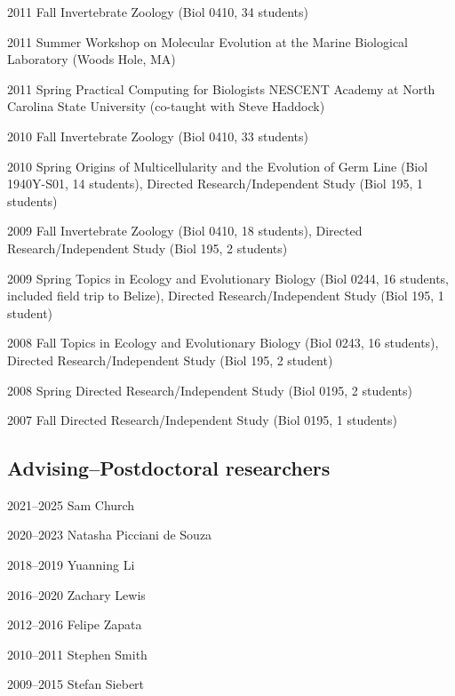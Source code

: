 \begin{entry}{60pt}
\item [\rm 2011 Fall] Invertebrate Zoology (Biol 0410, 34 students)
\item [\rm 2011 Summer] Workshop on Molecular Evolution at the Marine Biological Laboratory (Woods Hole, MA)
\item [\rm 2011 Spring] Practical Computing for Biologists NESCENT Academy at North Carolina State University (co-taught with Steve Haddock)
\item [\rm 2010 Fall] Invertebrate Zoology (Biol 0410, 33 students)
\item [\rm 2010 Spring] Origins of Multicellularity and the Evolution of Germ Line (Biol 1940Y-S01, 14 students), Directed Research/Independent Study (Biol 195, 1 students)
\item [\rm 2009 Fall] Invertebrate Zoology (Biol 0410, 18 students), Directed Research/Independent Study (Biol 195, 2 students)
\item [\rm 2009 Spring] Topics in Ecology and Evolutionary Biology (Biol 0244, 16 students, included field trip to Belize), Directed Research/Independent Study (Biol 195, 1 student)
\item [\rm 2008 Fall] Topics in Ecology and Evolutionary Biology (Biol 0243, 16 students), Directed Research/Independent Study (Biol 195, 2 student)
\item [\rm 2008 Spring] Directed Research/Independent Study (Biol 0195, 2 students)
\item [\rm 2007 Fall] Directed Research/Independent Study (Biol 0195, 1 students)

\end{entry}


\subsection*{Advising--Postdoctoral researchers}

\begin{entry}{60pt}
\item [\rm 2021--2025] Sam Church
\item [\rm 2020--2023] Natasha Picciani de Souza
\item [\rm 2018--2019] Yuanning Li
\item [\rm 2016--2020] Zachary Lewis
\item [\rm 2012--2016] Felipe Zapata
\item [\rm 2010--2011] Stephen Smith
\item [\rm 2009--2015] Stefan Siebert


\end{entry}


